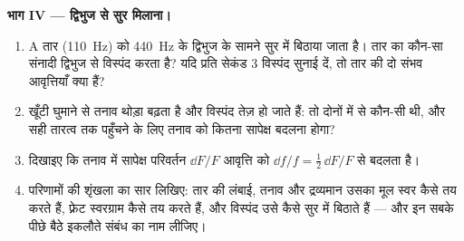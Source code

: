 \begin{problem}[{सप्ताहांत समस्या --- प्रयोग-मेज़ पर कंपित होता एक तार, एक
घिरनी और कुछ बाट, फिर एक गिटार: अर्ध-तरंगदैर्घ्यों की गिनती कैसे फ़्रेटबोर्ड
के हर स्वर को तय कर देती है}]
\medskip
\noindent\textbf{भाग IV --- द्विभुज से सुर मिलाना।}
\begin{enumerate}[resume]
  \item A तार (\qty{110}{Hz}) को \qty{440}{Hz} के द्विभुज के सामने सुर में
        बिठाया जाता है। तार का कौन-सा संनादी द्विभुज से विस्पंद करता है?
        यदि प्रति सेकंड \qty{3}{} विस्पंद सुनाई दें, तो तार की दो संभव
        आवृत्तियाँ क्या हैं?
  \item खूँटी घुमाने से तनाव थोड़ा बढ़ता है और विस्पंद तेज़ हो जाते हैं: तो
        दोनों में से कौन-सी थी, और सही तारत्व तक पहुँचने के लिए तनाव को
        कितना सापेक्ष बदलना होगा?
  \item दिखाइए कि तनाव में सापेक्ष परिवर्तन $\dd F/F$ आवृत्ति को
        $\dd f/f = \tfrac12\,\dd F/F$ से बदलता है।
  \item परिणामों की शृंखला का सार लिखिए: तार की लंबाई, तनाव और द्रव्यमान
        उसका मूल स्वर कैसे तय करते हैं, फ़्रेट स्वरग्राम कैसे तय करते हैं,
        और विस्पंद उसे कैसे सुर में बिठाते हैं --- और इन सबके पीछे बैठे
        इकलौते संबंध का नाम लीजिए।
\end{enumerate}
\end{problem}
